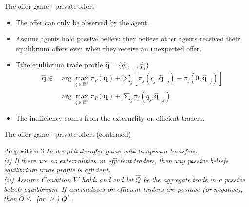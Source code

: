 \documentclass[aspectratio=169]{beamer}  %
\begin{document}
\begin{frame}{The offer game - private offers}
    \begin{itemize}
        \item The offer can only be observed by the agent. \vspace{.2cm}
        \item Assume agents hold passive beliefs: they believe other agents received their equilibrium offers even when they receive an unexpected offer. \vspace{.2cm}
        \item Tthe equlibrium trade profile $\hat{\mathbf{q}}=\{\hat{q_1},...,\hat{q_J}\}$ 
        \begin{equation}
            \begin{aligned}
                \hat{\mathbf{q}} \in &\arg \max_{q \in \mathbb{R}^J} \pi_P(\mathbf{q}) + \sum_j [\pi_j(q_j, \hat{\mathbf{q}}_{-j}) - \pi_j(0, \hat{\mathbf{q}}_{-j})]\\
                & \arg \max_{q \in \mathbb{R}^J} \pi_P(\mathbf{q}) + \sum_j \pi_j(q_j, \hat{\mathbf{q}}_{-j})
            \end{aligned}               
        \end{equation}
        \item The inefficiency comes from the externality on efficient traders.
    \end{itemize}
\end{frame}



\begin{frame}{The offer game - private offers (continued)}
    \begin{block}{Proposition 3}
        \textit{In the private-offer game with lump-sum transfers:\\
        (i) If there are no externalities on efficient traders, then any passive beliefs equilibrium trade profile is efficient.}\\
        \textit{(ii) Assume Condition $W$ holds and and let $\hat{Q}$ be the aggregate trade in a passive beliefs equilibrium. If externalities on efficient traders are positive (or negative), then $\hat{Q} \leq$ (or $\geq$) $Q^*$.}
    \end{block}
\end{frame}
\end{document}
